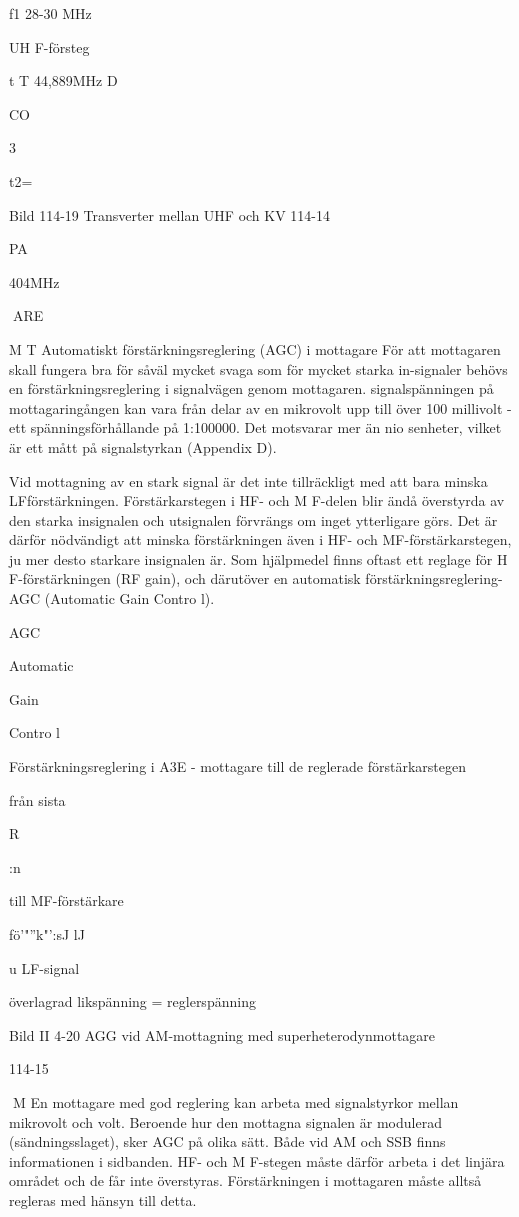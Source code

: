 \documentclass[a4paper,twoside,twocolumn,openright]{book}
\begin{document}
{{{f1 28-30 MHz

UH F-försteg

t
T 44,889MHz
D

CO

3

t2=

Bild 114-19 Transverter mellan UHF och KV
114-14

PA

404MHz

ARE

M T
Automatiskt förstärkningsreglering
(AGC) i mottagare
För att mottagaren skall fungera bra för
såväl mycket svaga som för mycket starka
in-signaler behövs en förstärkningsreglering
i signalvägen genom mottagaren. signalspänningen på mottagaringången kan vara
från delar av en mikrovolt upp till över 100
millivolt - ett spänningsförhållande på
1:100000. Det motsvarar mer än nio senheter, vilket är ett mått på signalstyrkan
(Appendix D).

Vid mottagning av en stark signal är det
inte tillräckligt med att bara minska LFförstärkningen. Förstärkarstegen i HF- och
M F-delen blir ändå överstyrda av den starka
insignalen och utsignalen förvrängs om inget ytterligare görs. Det är därför nödvändigt
att minska förstärkningen även i HF- och
MF-förstärkarstegen, ju mer desto starkare
insignalen är. Som hjälpmedel finns oftast
ett reglage för H F-förstärkningen (RF gain),
och därutöver en automatisk förstärkningsreglering- AGC (Automatic Gain Contro l).

AGC

Automatic

Gain

Contro l

Förstärkningsreglering i A3E - mottagare
till de reglerade förstärkarstegen

från sista

R

:n

till MF-förstärkare

fö'"''k"':sJ
lJ

u
LF-signal

överlagrad likspänning
= reglerspänning

Bild II 4-20 AGG vid AM-mottagning med superheterodynmottagare

114-15

M
En mottagare med god reglering kan
arbeta med signalstyrkor mellan mikrovolt
och volt. Beroende hur den mottagna signalen är modulerad (sändningsslaget), sker
AGC på olika sätt.
Både vid AM och SSB finns informationen i sidbanden. HF- och M F-stegen måste
därför arbeta i det linjära området och de får
inte överstyras. Förstärkningen i mottagaren måste alltså regleras med hänsyn till
detta.

}}}
\end{document}
